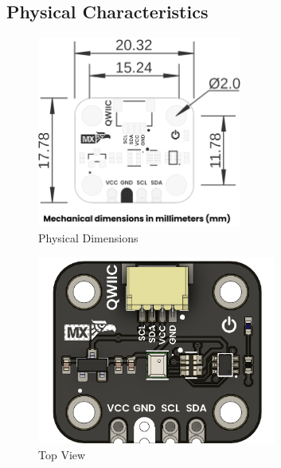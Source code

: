 \documentclass[11pt,a4paper]{article}
\begin{document}
\subsection{Physical Characteristics}


\begin{figure}[H]
\centering
\includegraphics[width=0.6\textwidth]{en_unit_dimension_v_1_0_0_icp10111_barometric_pressure_sensor.png}
\caption{Physical Dimensions}
\label{fig:en-unit-dimension-v-1-0-0-icp10111-barometric-pressure-sensor-png}
\end{figure}




\begin{figure}[H]
\centering
\includegraphics[width=0.7\textwidth]{en_unit_top_v_1_0_0_icp10111_barometric_pressure_sensor.png}
\caption{Top View}
\label{fig:en-unit-top-v-1-0-0-icp10111-barometric-pressure-sensor-png}
\end{figure}
\end{document}

